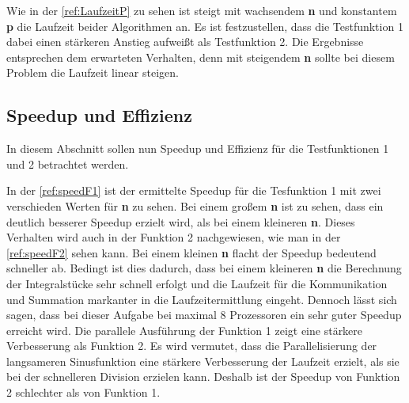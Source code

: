 Wie in der \autoref{ref:LaufzeitP} zu sehen ist steigt mit wachsendem \textbf{n} und konstantem \textbf{p} die Laufzeit beider Algorithmen an.
Es ist festzustellen, dass die Testfunktion 1 dabei einen stärkeren Anstieg aufweißt als Testfunktion 2.
Die Ergebnisse entsprechen dem erwarteten Verhalten, denn mit steigendem \textbf{n} sollte bei diesem Problem die Laufzeit linear steigen.

\subsection{Speedup und Effizienz}
In diesem Abschnitt sollen nun Speedup und Effizienz für die Testfunktionen 1 und 2 betrachtet werden.

In der \autoref{ref:speedF1} ist der ermittelte Speedup für die Tesfunktion 1 mit zwei verschieden Werten für \textbf{n} zu sehen.
Bei einem großem \textbf{n} ist zu sehen, dass ein deutlich besserer Speedup erzielt wird, als bei einem kleineren \textbf{n}.
Dieses Verhalten wird auch in der Funktion 2 nachgewiesen, wie man in der \autoref{ref:speedF2} sehen kann.
Bei einem kleinen \textbf{n} flacht der Speedup bedeutend schneller ab.
Bedingt ist dies dadurch, dass bei einem kleineren \textbf{n} die Berechnung der Integralstücke sehr schnell erfolgt und die Laufzeit für die Kommunikation und Summation markanter in die Laufzeitermittlung eingeht.
Dennoch lässt sich sagen, dass bei dieser Aufgabe bei maximal 8 Prozessoren ein sehr guter Speedup erreicht wird.
Die parallele Ausführung der Funktion 1 zeigt eine stärkere Verbesserung als Funktion 2. 
Es wird vermutet, dass die Parallelisierung der langsameren Sinusfunktion eine stärkere Verbesserung der Laufzeit erzielt, als sie bei der schnelleren Division erzielen kann.
Deshalb ist der Speedup von Funktion 2 schlechter als von Funktion 1.
